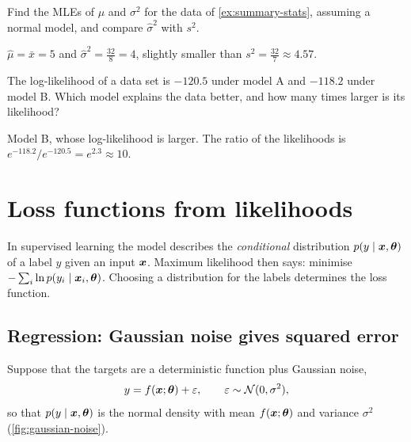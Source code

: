 \begin{exercise}
Find the MLEs of $\mu$ and $\sigma^2$ for the data of \cref{ex:summary-stats},
assuming a normal model, and compare $\hat\sigma^2$ with $s^2$.
\end{exercise}
\begin{solution}
$\hat\mu = \bar x = 5$ and $\hat\sigma^2 = \tfrac{32}{8} = 4$, slightly smaller
than $s^2 = \tfrac{32}{7} \approx 4.57$.
\end{solution}

\begin{exercise}
The log-likelihood of a data set is $-120.5$ under model A and $-118.2$ under
model B. Which model explains the data better, and how many times larger is its
likelihood?
\end{exercise}
\begin{solution}
Model B, whose log-likelihood is larger. The ratio of the likelihoods is
$e^{-118.2}/e^{-120.5} = e^{2.3} \approx 10$.
\end{solution}

\section{Loss functions from likelihoods}\label{sec:losses-from-likelihood}

In supervised learning the model describes the \emph{conditional} distribution
$p(y \mid \bm{x}, \bm{\theta})$ of a label $y$ given an input $\bm{x}$. Maximum likelihood
then says: minimise $-\sum_i\ln p(y_i \mid \bm{x}_i, \bm{\theta})$. Choosing a
distribution for the labels determines the loss function.

\subsection{Regression: Gaussian noise gives squared error}

Suppose that the targets are a deterministic function plus Gaussian noise,
\[
  y = f(\bm{x}; \bm{\theta}) + \varepsilon,
  \qquad \varepsilon \sim \mathcal{N}(0, \sigma^2),
\]
so that $p(y \mid \bm{x}, \bm{\theta})$ is the normal density with mean $f(\bm{x};
\bm{\theta})$ and variance $\sigma^2$ (\cref{fig:gaussian-noise}).

